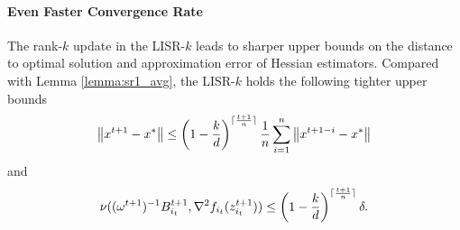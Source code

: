 \documentclass[letterpaper]{article} %
\theoremstyle{plain}
\theoremstyle{definition}
\theoremstyle{remark}
\DeclarePairedDelimiter\ceil{\lceil}{\rceil}
\newcommand\norm[1]{\left\lVert#1\right\rVert}
\begin{document}
\paragraph{Even Faster Convergence Rate} 

The rank-$k$ update in the LISR-$k$ leads to sharper upper bounds on the distance to optimal solution and approximation error of Hessian estimators.
Compared with Lemma \ref{lemma:sr1_avg}, the LISR-$k$ holds the following tighter upper bounds
\begin{equation*}
    \norm{x^{t+1} - x^*} \leq \left(1 - \frac{k}{d}\right)^{\ceil{\frac{t+1}{n}}}\frac{1}{n}\sum_{i=1}^n \norm{x^{t+1-i} - x^*}
\end{equation*}
and
\begin{equation*}
    \nu((\omega^{t+1})^{-1} B_{i_t}^{t+1}, \nabla^2 f_{i_t}(z_{i_t}^{t+1})) \leq \left(1 - \frac{k}{d} \right)^{\ceil{\frac{t+1}{n}}} \delta.
\end{equation*}
\end{document}
